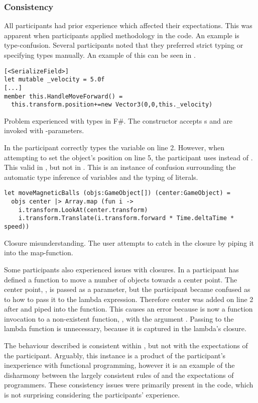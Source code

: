 \subsubsection{Consistency}\label{sec:part-cons} %
All participants had prior \cs experience which affected their expectations. This was apparent when participants applied \cs methodology in the \fs code. An example is type-confusion. Several participants noted that they preferred strict typing or specifying types manually. An example of this can be seen in .

\begin{listing}[H]
\begin{verbatim}
[<SerializeField>]
let mutable _velocity = 5.0f
[...]
member this.HandleMoveForward() =
  this.transform.position+=new Vector3(0,0,this._velocity)
\end{verbatim}
\caption{Problem experienced with types in F\#. The  constructor accepts s and are invoked with -parameters.}
\label{lst:type-conf}
\end{listing}

In  the participant correctly types the  variable on line 2. However, when attempting to set the object's position on line 5, the participant uses  instead of . This valid in \cs, but not in \fs. This is an instance of confusion surrounding the automatic type inference of variables and the typing of literals.

\begin{listing}[H]
\begin{verbatim}
let moveMagneticBalls (objs:GameObject[]) (center:GameObject) =
  objs center |> Array.map (fun i ->
    i.transform.LookAt(center.transform)
    i.transform.Translate(i.transform.forward * Time.deltaTime * speed))
\end{verbatim}
\caption{Closure misunderstanding. The user attempts to catch  in the closure by piping it into the map-function.}
\label{lst:clos-mis}
\end{listing}

Some participants also experienced issues with closures. In  a participant has defined a function to move a number of objects towards a center point. The center point, , is passed as a parameter, but the participant became confused as to how to pass it to the lambda expression. Therefore center was added on line 2 after  and piped into the  function. This causes an error because  is now a function invocation to a non-existent function, , with the argument . Passing  to the lambda function is unnecessary, because it is captured in the lambda's closure.

The behaviour described is consistent within \fs, but not with the expectations of the participant. Arguably, this instance is a product of the participant's inexperience with functional programming, however it is an example of the disharmony between the largely consistent rules of \fs and the expectations of programmers. These consistency issues were primarily present in the \fs code, which is not surprising considering the participants' experience.
